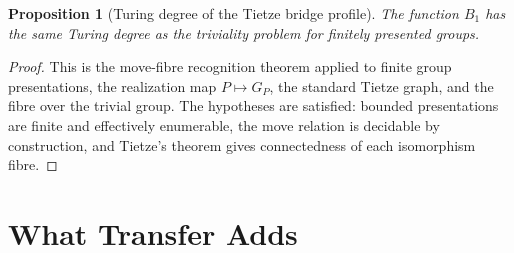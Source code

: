 \documentclass[11pt]{article}
\newtheorem{proposition}[theorem]{Proposition}
\begin{document}
\begin{proposition}[Turing degree of the Tietze bridge profile]
The function \(B_1\) has the same Turing degree as the triviality problem for finitely presented groups.
\end{proposition}

\begin{proof}
This is the move-fibre recognition theorem applied to finite group presentations, the realization map \(P\mapsto G_P\), the standard Tietze graph, and the fibre over the trivial group. The hypotheses are satisfied: bounded presentations are finite and effectively enumerable, the move relation is decidable by construction, and Tietze's theorem gives connectedness of each isomorphism fibre.
\end{proof}

\section{What Transfer Adds}
\end{document}

